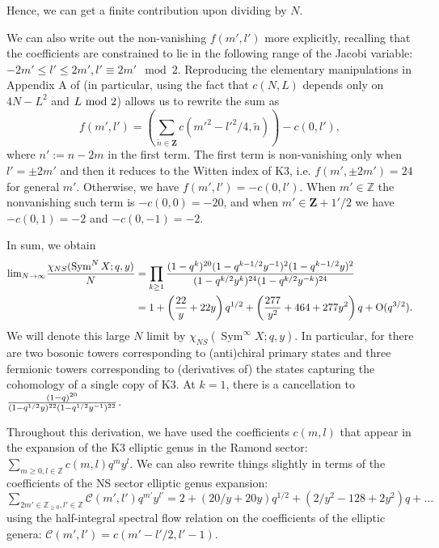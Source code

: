 \documentclass[11pt]{amsart}
\newcommand{\Z}{\mathbf Z}
\DeclareMathOperator{\Sym}{Sym} \DeclareMathOperator{\Hom}{Hom}
\theoremstyle{thm}
\numberwithin{equation}{subsection}
\theoremstyle{def}
\theoremstyle{rem}
\begin{document}
Hence, we can get a finite contribution upon dividing by $N$. 

We can also write out the non-vanishing $f(m', l')$ more explicitly, recalling that the coefficients are constrained to lie in the following range of the Jacobi variable: $-2m' \leq l' \leq 2m', l' \equiv 2 m' \mod 2$. Reproducing the elementary manipulations in Appendix A of \cite{BKKP} (in particular, using the fact that $c(N, L)$ depends only on $4N-L^2$ and $L \ {\rm mod} \ 2$) allows us to rewrite the sum as
\begin{equation}\label{eq:fml2}
f(m', l') = \left( \sum_{\tilde{n} \in \Z}c(m'^2 - l'^2/4, \tilde{n}) \right) - c(0, l'),
\end{equation} where $n':= n - 2m$ in the first term. 
The first term is non-vanishing only when $l' = \pm 2 m'$ and then it reduces to the Witten index of K3, i.e. $f(m', \pm 2m') = 24$ for general $m'$. Otherwise, we have $f(m', l') = -c(0, l')$. When $m' \in \mathbb{Z}$ the nonvanishing such term is $-c(0, 0) = -20$, and when $m' \in \Z + 1'/2$ we have $-c(0, 1) = -2$ and $-c(0, -1) = -2$. 

In sum, we obtain
\begin{align*}
{\rm lim}_{N \rightarrow \infty}{\chi_{NS}(\Sym^{N} X; q, y) \over N} &= \prod_{k \geq 1}{(1 - q^k)^{20}(1 - q^{k-1/2}y^{-1})^2(1 - q^{k-1/2}y)^2 \over (1 - q^{k/2}y^k)^{24}(1 - q^{k/2}y^{-k})^{24}} \\
&= 1 + \left({22 \over y} + 22 y \right)q^{1/2} + \left({277 \over y^2} + 464 + 277 y^2 \right)q + \text{O}(q^{3/2}).
\end{align*} 
We will denote this large $N$ limit by $\chi_{NS}(\Sym^\infty X ; q,y)$. 
In particular, for there are two bosonic towers corresponding to (anti)chiral primary states and three fermionic towers corresponding to (derivatives of) the states capturing the cohomology of a single copy of K3. At $k=1$, there is a cancellation to ${(1 - q)^{20} \over (1 - q^{1/2}y)^{22}(1 - q^{1/2}y^{-1})^{22}}$.

Throughout this derivation, we have used the coefficients $c(m, l)$ that appear in the expansion of the K3 elliptic genus in the Ramond sector: $\sum_{m \geq 0, l \in \mathbb{Z}} c(m, l) q^m y^l$. We can also rewrite things slightly in terms of the coefficients of the NS sector elliptic genus expansion: $\sum_{2 m' \in \mathbb{Z}_{\geq 0}, l' \in \mathbb{Z}} \mathcal{C}(m', l') q^{m'} y^{l'} = 2 + (20/y + 20 y)q^{1/2} + (2/y^2 - 128 + 2 y^2)q + \ldots$ using the half-integral spectral flow relation on the coefficients of the elliptic genera: $\mathcal{C}(m', l') = c(m'-l'/2, l'-1)$. 
\end{document}
